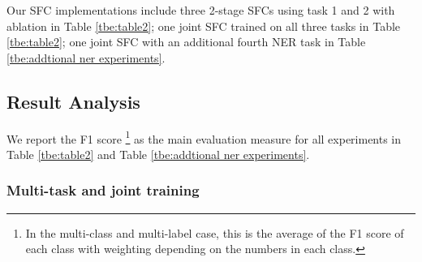 Our SFC implementations include three 2-stage SFCs using task 1 and 2 with ablation in Table \ref{tbe:table2}; one joint SFC trained on all three tasks in Table \ref{tbe:table2}; one joint SFC with an additional fourth NER task in Table \ref{tbe:addtional ner experiments}. 

\subsection{Result Analysis}
We report the F1 score \footnote{In the multi-class and multi-label case, this
is the average of the F1 score of each class with weighting depending on the
numbers in each class.} as the main evaluation measure for all experiments in
Table \ref{tbe:table2} and Table \ref{tbe:addtional ner experiments}.

\subsubsection*{Multi-task and joint training} 
\begin{table}
  \begin{centering}
  \end{centering}

  \caption{
    F1 scores for joint sentence classification and NER training. 
    We iterate various sample number per intent and test on original test set.
  }
  \label{tbe:addtional ner experiments}
\end{table}

